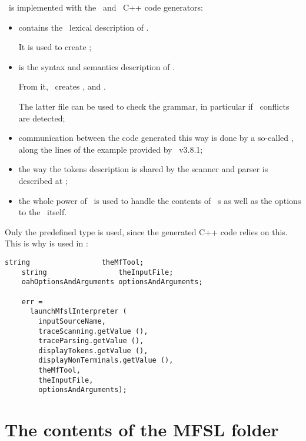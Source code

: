 \mfslLang\ is implemented with the \flex\ and \bison\ C++ code generators:
\begin{itemize}
\item {} contains the \flex\ lexical description of \mfslLang.

It is used to create ;

\item {} is the syntax and semantics description of \mfslLang.

From it, \bison\ creates ,  and .

The latter file can be used to check the grammar, in particular if \LR\ conflicts are detected;

\item communication between the code generated this way is done by a so-called , along the lines of the  example provided by \bison\ v3.8.1;

\item the way the tokens description is shared by the scanner and parser is described at ;

\item the whole power of \oahRepr\ is used to handle the contents of \mfslLang\ \script s as well as the options to the \mfslLangInterp\ itself.
\end{itemize}

Only the predefined  type is used, since the generated C++ code relies on this. This is why  is used in :
\begin{lstlisting}[language=CPlusPlus]
    string                 theMfTool;
    string                 theInputFile;
    oahOptionsAndArguments optionsAndArguments;

    err =
      launchMfslInterpreter (
        inputSourceName,
        traceScanning.getValue (),
        traceParsing.getValue (),
        displayTokens.getValue (),
        displayNonTerminals.getValue (),
        theMfTool,
        theInputFile,
        optionsAndArguments);
\end{lstlisting}


\section{The contents of the MFSL folder}

